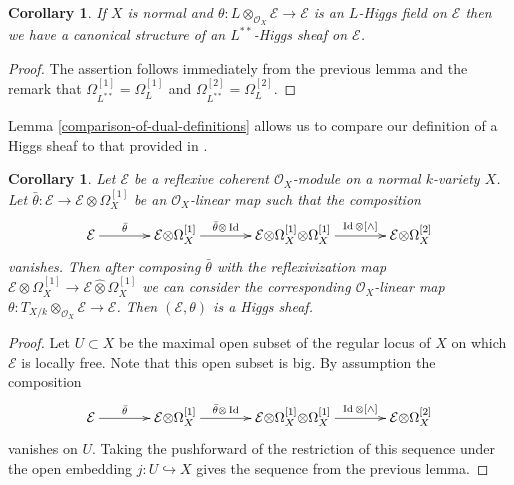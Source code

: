 \documentclass[12pt]{article}
\theoremstyle{plain}
\newtheorem{Corollary}[Thm]{\sc Corollary}
\theoremstyle{definition}
\theoremstyle{remark}
\newcommand{\cE}{{\mathcal E}}
\newcommand{\cO}{{\mathcal O}}
\newcommand{\id}{\mathop{\rm Id}}
\begin{document}
\medskip

\begin{Corollary}\label{passing-to-reflexivization}
If $X$ is normal  and $\theta :  L\otimes _{\cO_X} \cE\to \cE$ is an  $L$-Higgs field on $\cE$
 then we have a canonical structure of an $L^{**}$-Higgs sheaf on $\cE$.
\end{Corollary}

\begin{proof}
	The assertion follows immediately from the previous lemma and the remark that
$\Omega_{L^{**}}^{[1]}= \Omega_L^{[1]}$ and $\Omega_{L^{**}}^{[2]}= \Omega_L^{[2]}$.
\end{proof}




\medskip

Lemma \ref{comparison-of-dual-definitions}
allows us to compare our definition of a Higgs sheaf to that provided in \cite[Definition 5.1]{GKPT2}.


\begin{Corollary}\label{comparison-to-GKPT}
Let $\cE$ be a reflexive coherent $\cO_X$-module on a normal $k$-variety $X$.
Let  $\bar\theta: \cE\to \cE{\otimes} \Omega_X^{[1]}$ be an $\cO_X$-linear map such that 
the composition
$$\xymatrixcolsep{3pc}\xymatrix{
	\cE\ar[r]^-{\bar\theta}& \cE{\otimes} \Omega_X^{[1]}\ar[r]^-{\bar\theta{\otimes }\id}&
	\cE{\otimes} \Omega_X^{[1]}{\otimes} \Omega_X^{[1]}\ar[r]^-{\id {\otimes}[\wedge]}&
	\cE{\otimes} \Omega_X^{[2]}\\
}
$$
vanishes. Then after composing $\bar\theta$ with the reflexivization map $\cE{\otimes} \Omega_X^{[1]}\to \cE \hat{\otimes} \Omega_X^{[1]}$ we can consider the corresponding $\cO_X$-linear map 
$\theta: T_{X/k}\otimes _{\cO_X} \cE\to \cE$. Then $(\cE, \theta)$ is a Higgs sheaf.
\end{Corollary}

\begin{proof}
Let $U\subset X$ be the maximal open subset of the regular locus of $X$ on which $\cE$ is locally free. Note that this open subset is big. By assumption the composition
$$\xymatrixcolsep{3pc}\xymatrix{
	\cE\ar[r]^-{\bar\theta}& \cE{\otimes} \Omega_X^{[1]}\ar[r]^-{\bar\theta{\otimes }\id}&
	\cE{\otimes} \Omega_X^{[1]}{\otimes} \Omega_X^{[1]}\ar[r]^-{\id {\otimes}[\wedge]}&
	\cE{\otimes} \Omega_X^{[2]}\\
}
$$
vanishes on $U$. Taking the pushforward of the restriction of this sequence under the open embedding
$j: U\hookrightarrow X$ gives the sequence from the previous lemma.
\end{proof}
\end{document}
